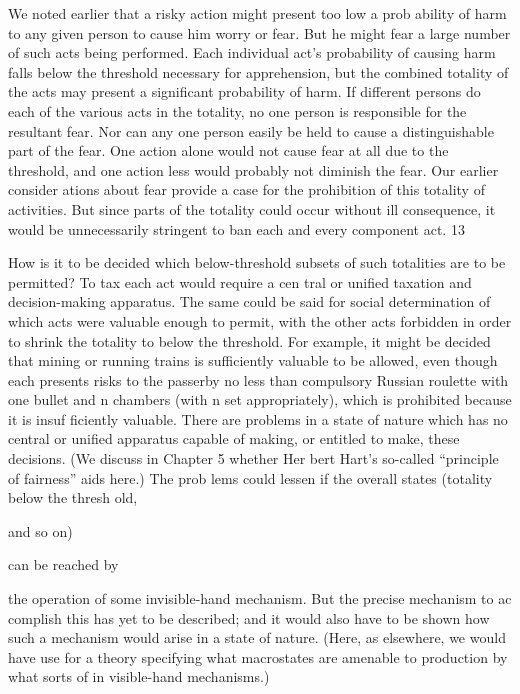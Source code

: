 \documentclass[11pt,openany]{book}
\begin{document}
We noted earlier that a risky action might present too low a prob ability of harm to any given person to cause him worry or fear. But he might fear a large number of such acts being performed. Each individual act's probability of causing harm falls below the threshold necessary for apprehension, but the combined totality of the acts may present a significant probability of harm. If different persons do each of the various acts in the totality, no one person is responsible for the resultant fear. Nor can any one person easily be held to cause a distinguishable part of the fear. One action alone would not cause fear at all due to the threshold, and one action less would probably not diminish the fear. Our earlier consider ations about fear provide a case for the prohibition of this totality of activities. But since parts of the totality could occur without ill consequence, it would be unnecessarily stringent to ban each and every component act. 13 

How is it to be decided which below-threshold subsets of such totalities are to be permitted? To tax each act would require a cen tral or unified taxation and decision-making apparatus. The same could be said for social determination of which acts were valuable enough to permit, with the other acts forbidden in order to shrink the totality to below the threshold. For example, it might be decided that mining or running trains is sufficiently valuable to be allowed, even though each presents risks to the passerby no less than compulsory Russian roulette with one bullet and n chambers (with n set appropriately), which is prohibited because it is insuf ficiently valuable. There are problems in a state of nature which has no central or unified apparatus capable of making, or entitled to make, these decisions. (We discuss in Chapter 5 whether Her bert Hart's so-called ``principle of fairness'' aids here.) The prob lems could lessen if the overall states (totality below the thresh old, 

and so on) 

can be reached by 

the operation of some invisible-hand mechanism. But the precise mechanism to ac complish this has yet to be described; and it would also have to be shown how such a mechanism would arise in a state of nature. (Here, as elsewhere, we would have use for a theory specifying what macrostates are amenable to production by what sorts of in visible-hand mechanisms.) 
\end{document}
